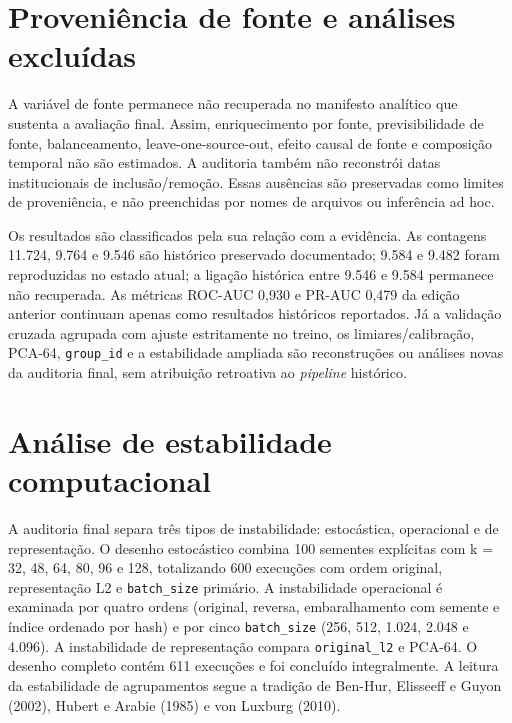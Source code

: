 
\section{Proveniência de fonte e análises excluídas}

A variável de fonte permanece não recuperada no manifesto analítico que sustenta a avaliação final. Assim, enriquecimento por fonte, previsibilidade de fonte, balanceamento, leave-one-source-out, efeito causal de fonte e composição temporal não são estimados. A auditoria também não reconstrói datas institucionais de inclusão/remoção. Essas ausências são preservadas como limites de proveniência, e não preenchidas por nomes de arquivos ou inferência ad hoc.

Os resultados são classificados pela sua relação com a evidência. As contagens 11.724, 9.764 e 9.546 são histórico preservado documentado; 9.584 e 9.482 foram reproduzidas no estado atual; a ligação histórica entre 9.546 e 9.584 permanece não recuperada. As métricas ROC-AUC 0,930 e PR-AUC 0,479 da edição anterior continuam apenas como resultados históricos reportados. Já a validação cruzada agrupada com ajuste estritamente no treino, os limiares/calibração, PCA-64, \texttt{group\_id} e a estabilidade ampliada são reconstruções ou análises novas da auditoria final, sem atribuição retroativa ao \emph{pipeline} histórico.

\section{Análise de estabilidade computacional}

A auditoria final separa três tipos de instabilidade: estocástica, operacional e de representação. O desenho estocástico combina 100 sementes explícitas com k = 32, 48, 64, 80, 96 e 128, totalizando 600 execuções com ordem original, representação L2 e \texttt{batch\_size} primário. A instabilidade operacional é examinada por quatro ordens (original, reversa, embaralhamento com semente e índice ordenado por hash) e por cinco \texttt{batch\_size} (256, 512, 1.024, 2.048 e 4.096). A instabilidade de representação compara \texttt{original\_l2} e PCA-64. O desenho completo contém 611 execuções e foi concluído integralmente. A leitura da estabilidade de agrupamentos segue a tradição de Ben-Hur, Elisseeff e Guyon (2002), Hubert e Arabie (1985) e von Luxburg (2010).

